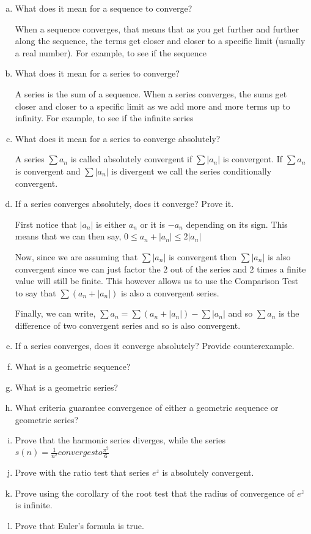 \documentclass{article}
\begin{document}
\begin{enumerate}[a.]
	\item What does it mean for a sequence to converge?

	When a sequence converges, that means that as you get further and further along the sequence, the terms get closer and closer to a specific limit (usually a real number). For example, to see if the sequence

	\item What does it mean for a series to converge?

    A series is the sum of a sequence. When a series converges, the sums get closer and closer to a specific limit as we add more and more terms up to infinity. For example, to see if the infinite series

	\item What does it mean for a series to converge absolutely?

    A series $\sum a_n$ is called absolutely convergent if $\sum |a_n|$ is convergent. If $\sum a_n$ is convergent and $\sum |a_n|$ is divergent we call the series conditionally convergent.

	\item If a series converges absolutely, does it converge? Prove it.

    First notice that $|a_n|$ is either $a_n$ or it is $-a_n$ depending on its sign. This means that we can then say, $0 \leq a_n + |a_n| \leq 2|a_n|$

    Now, since we are assuming that $\sum |a_n| $ is convergent then $\sum |a_n| $ is also convergent since we can just factor the 2 out of the series and 2 times a finite value will still be finite. This however allows us to use the Comparison Test to say that $\sum(a_n + |a_n|)$ is also a convergent series.

    Finally, we can write, $\sum a_n = \sum(a_n + |a_n|) - \sum |a_n|$ and so $\sum a_n$ is the difference of two convergent series and so is also convergent.

	\item If a series converges, does it converge absolutely? Provide counterexample.



	\item What is a geometric sequence?
	\item What is a geometric series?
	\item What criteria guarantee convergence of either a geometric sequence or geometric series?
	\item Prove that the harmonic series diverges, while the series $s(n) = \frac{1}{n^2} converges to \frac{\pi^2}{6}$
	\item Prove with the ratio test that series $e^z$ is absolutely convergent.
	\item Prove using the corollary of the root test that the radius of convergence of $e^z$ is infinite.
	\item Prove that Euler's formula is true.


\end{enumerate}
\end{document}
